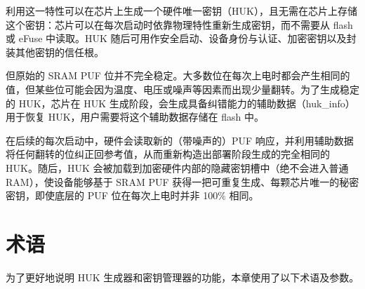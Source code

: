 \documentclass[main\_\_CN.tex]{subfiles}
\begin{document}
利用这一特性可以在芯片上生成一个硬件唯一密钥（HUK），且无需在芯片上存储这个密钥：芯片可以在每次启动时依靠物理特性重新生成密钥，而不需要从 flash 或 eFuse 中读取。HUK 随后可用作安全启动、设备身份与认证、加密密钥以及封装其他密钥的信任根。

但原始的 SRAM PUF 位并不完全稳定。大多数位在每次上电时都会产生相同的值，但某些位可能会因为温度、电压或噪声等因素而出现少量翻转。为了生成稳定的 HUK，芯片在 HUK 生成阶段，会生成具备纠错能力的辅助数据（huk\_info）用于恢复 HUK，用户需要将这个辅助数据存储在 flash 中。

在后续的每次启动中，硬件会读取新的（带噪声的）PUF 响应，并利用辅助数据将任何翻转的位纠正回参考值，从而重新构造出部署阶段生成的完全相同的 HUK。随后，HUK 会被加载到加密硬件内部的隐藏密钥槽中（绝不会进入普通 RAM），使设备能够基于 SRAM PUF 获得一把可重复生成、每颗芯片唯一的秘密密钥，即使底层的 PUF 位在每次上电时并非 100\% 相同。


\section{术语}

为了更好地说明 HUK 生成器和密钥管理器的功能，本章使用了以下术语及参数。
\end{document}
